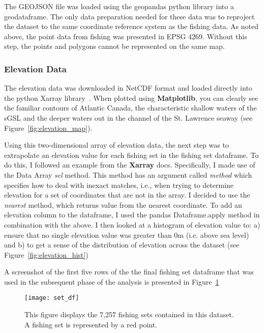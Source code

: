 The GEOJSON file was loaded using the geopandas python library into a geodataframe.
The only data preparation needed for these data was to reproject the dataset to the same coordinate reference system as the fishing data.
As noted above, the point data from fishing was presented in EPSG 4269.
Without this step, the points and polygons cannot be represented on the same map.


\subsubsection{Elevation Data}

The elevation data was downloaded in NetCDF format and loaded directly into the python Xarray library~\cite{xarray}.
When plotted using \textbf{Matplotlib}, you can clearly see the familiar contours of Atlantic Canada, the characteristic
shallow waters of the sGSL and the deeper waters out in the channel of the St. Lawrence seaway (see Figure~\ref{fig:elevation_map}).

Using this two-dimensional array of elevation data, the next step was to extrapolate an elevation value for each fishing set in the fishing set dataframe.
To do this, I followed an example from the \textbf{Xarray} docs.
Specifically, I made use of the Data Array \textit{sel} method.
This method has an argument called \textit{method} which specifies how to deal with inexact matches, i.e.,
when trying to determine elevation for a set of coordinates that are not in the array. I decided to use the \textit{nearest} method,
which returns value from the nearest coordinate.
To add an elevation column to the dataframe, I used the pandas Dataframe.apply method in combination with the above.
I then looked at a histogram of elevation value to: a) ensure that no single elevation value was greater than 0m (i.e. above sea level)
and b) to get a sense of the distribution of elevation across the dataset (see Figure~\ref{fig:elevation_hist})

A screenshot of the first five rows of the the final fishing set dataframe that was used in the subsequent phase of the analysis is presented in
Figure~\ref{fig:set_df}


\begin{figure}
    \texttt{[image: set\_df]}
    \caption{This figure displays the 7,257 fishing sets contained in this dataset. A fishing set is represented by a red point.}
    \label{fig:set_df}
\end{figure}



